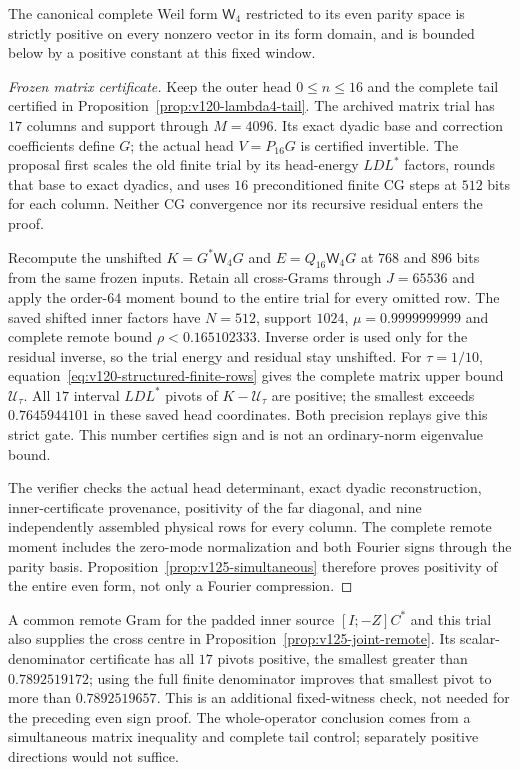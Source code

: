\begin{proposition}[The complete even form at $\lambda=4$]
\label{prop:v125-even-complete}
The canonical complete Weil form $\mathsf W_4$ restricted to its
even parity space is strictly positive on every nonzero vector
in its form domain, and is bounded below by a positive constant
at this fixed window.
\end{proposition}
\begin{proof}[Frozen matrix certificate]
Keep the outer head $0\le n\le16$ and the complete tail certified
in Proposition~\ref{prop:v120-lambda4-tail}.  The archived matrix
trial has $17$ columns and support through $M=4096$.  Its exact
dyadic base and correction coefficients define $G$; the actual
head $V=P_{16}G$ is certified invertible.  The proposal first scales
the old finite trial by its head-energy $LDL^*$ factors, rounds
that base to exact dyadics, and uses $16$ preconditioned finite CG
steps at $512$ bits for each column.  Neither CG convergence nor
its recursive residual enters the proof.

Recompute the unshifted $K=G^*\mathsf W_4G$ and
$E=Q_{16}\mathsf W_4G$ at $768$ and $896$ bits from the same
frozen inputs.  Retain all cross-Grams through $J=65536$ and apply
the order-$64$ moment bound to the entire trial for every omitted
row.  The saved shifted inner factors have $N=512$, support $1024$,
$\mu=0.9999999999$ and complete remote bound
$\rho<0.165102333$.  Inverse order is used only for the residual
inverse, so the trial energy and residual stay unshifted.
For $\tau=1/10$, equation~\eqref{eq:v120-structured-finite-rows}
gives the complete matrix upper bound $\mathcal U_\tau$.
All $17$ interval $LDL^*$ pivots of $K-\mathcal U_\tau$ are positive;
the smallest exceeds $0.7645944101$ in these saved head coordinates.
Both precision replays give this strict gate.  This number certifies
sign and is not an ordinary-norm eigenvalue bound.

The verifier checks the actual head determinant, exact dyadic
reconstruction, inner-certificate provenance, positivity of the
far diagonal, and nine independently assembled physical rows for
every column.  The complete remote moment includes the zero-mode
normalization and both Fourier signs through the parity basis.
Proposition~\ref{prop:v125-simultaneous} therefore proves positivity
of the entire even form, not only a Fourier compression.
\end{proof}

A common remote Gram for the padded inner source $[I;-Z]C^*$ and
this trial also supplies the cross centre in
Proposition~\ref{prop:v125-joint-remote}.  Its scalar-denominator
certificate has all $17$ pivots positive, the smallest greater than
$0.7892519172$; using the full finite denominator improves that
smallest pivot to more than $0.7892519657$.  This is an additional
fixed-witness check, not needed for the preceding even sign proof.
The whole-operator conclusion comes from a simultaneous matrix
inequality and complete tail control; separately positive directions
would not suffice.

